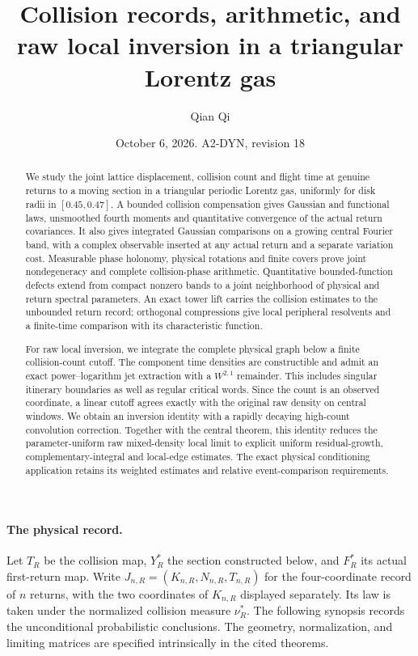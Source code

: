 \documentclass[11pt,reqno]{amsart}
\title[Collision records and raw local inversion]{Collision records, arithmetic, and raw local inversion in a triangular Lorentz gas}
\author{Qian Qi}
\date{October 6, 2026. A2-DYN, revision 18}
\numberwithin{equation}{section}
\theoremstyle{definition}\newtheorem{definition}[theorem]{Definition}
\theoremstyle{remark}\newtheorem{remark}[theorem]{Remark}
\begin{document}
\raggedbottom
\begin{abstract}
We study the joint lattice displacement, collision count and flight time
at genuine returns to a moving section in a triangular periodic Lorentz
gas, uniformly for disk radii in $[0.45,0.47]$. A bounded collision
compensation gives Gaussian and functional laws, unsmoothed fourth
moments and quantitative convergence of the actual return covariances.
It also gives integrated Gaussian comparisons on a growing central
Fourier band, with a complex observable inserted at any actual return
and a separate variation cost. Measurable phase holonomy, physical
rotations and finite covers prove joint nondegeneracy and complete
collision-phase arithmetic. Quantitative bounded-function defects extend
from compact nonzero bands to a joint neighborhood of physical and
return spectral parameters. An exact tower lift carries the collision
estimates to the unbounded return record; orthogonal compressions give
local peripheral resolvents and a finite-time comparison with its
characteristic function.

For raw local inversion, we integrate the complete physical graph below
a finite collision-count cutoff. The component time densities are
constructible and admit an exact power--logarithm jet extraction with a
$W^{2,1}$ remainder. This includes singular itinerary boundaries as well
as regular critical words. Since the count is an observed coordinate,
a linear cutoff agrees exactly with the original raw density on central
windows. We obtain an inversion identity with a rapidly decaying
high-count convolution correction. Together with the central theorem,
this identity reduces the parameter-uniform raw mixed-density local
limit to explicit uniform residual-growth, complementary-integral and
local-edge estimates. The exact physical conditioning application retains
its weighted estimates and relative event-comparison requirements.
\end{abstract}
\maketitle

\paragraph{The physical record.}
Let $T_R$ be the collision map, $Y_R^*$ the section constructed below,
and $F_R^*$ its actual first-return map. Write
$J_{n,R}=(K_{n,R},N_{n,R},T_{n,R})$ for the four-coordinate record of
$n$ returns, with the two coordinates of $K_{n,R}$ displayed separately.
Its law is taken under the normalized collision measure $\nu_R^*$.
The following synopsis records the unconditional probabilistic
conclusions. The geometry, normalization, and limiting matrices are
specified intrinsically in the cited theorems.
\end{document}

